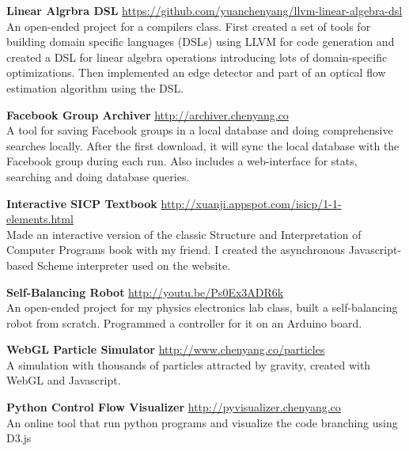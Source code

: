 \documentclass[9pt]{article}
\newenvironment{changemargin}[2]{%
  \begin{list}{}{%
      \setlength{\topsep}{0pt}%
      \setlength{\leftmargin}{#1}%
      \setlength{\rightmargin}{#2}%
      \setlength{\listparindent}{\parindent}%
      \setlength{\itemindent}{\parindent}%
      \setlength{\parsep}{\parskip}%
    }%
  \item[]}{\end{list}
}
\newenvironment{body} {
  \vspace*{-16pt}
  \begin{changemargin}{-0.25in}{-0.5in}
  }
  {\end{changemargin}
}
\begin{document}
\begin{body}
  \vspace{14pt}

  \textbf{Linear Algrbra DSL} \hfill \url{https://github.com/yuanchenyang/llvm-linear-algebra-dsl} \\
  An open-ended project for a compilers class. First created a set of tools for
  building domain specific languages (DSLs) using LLVM for code generation and
  created a DSL for linear algebra operations introducing lots of
  domain-specific optimizations. Then implemented an edge detector and part of
  an optical flow estimation algorithm using the DSL.
  \medskip

  \textbf{Facebook Group Archiver} \hfill \url{http://archiver.chenyang.co}\\
  A tool for saving Facebook groups in a local database and doing comprehensive
  searches locally. After the first download, it will sync the local database
  with the Facebook group during each run. Also includes a web-interface for
  stats, searching and doing database queries. \\
  \medskip

  \textbf{Interactive SICP Textbook} \hfill
  \url{http://xuanji.appspot.com/isicp/1-1-elements.html}\\
  Made an interactive version of the classic Structure and Interpretation of
  Computer Programs book with my friend. I created the asynchronous
  Javascript-based Scheme interpreter used on the website. \\
  \medskip

  \textbf{Self-Balancing Robot} \hfill \url{http://youtu.be/Ps0Ex3ADR6k} \\
  An open-ended project for my physics electronics lab class, built a
  self-balancing robot from scratch. Programmed a controller for it on an
  Arduino board. \\
  \medskip

  \textbf{WebGL Particle Simulator} \hfill \url{http://www.chenyang.co/particles}\\
  A simulation with thousands of particles attracted by gravity, created with  WebGL and Javascript. \\
  \medskip

  \textbf{Python Control Flow Visualizer} \hfill \url{http://pyvisualizer.chenyang.co}\\
  An online tool that run python programs and visualize the code branching using D3.js\\
  \medskip


\end{body}
\end{document}
